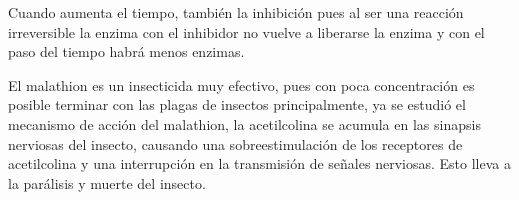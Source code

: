 Cuando aumenta el tiempo, también la inhibición pues al ser una reacción irreversible la enzima con el inhibidor no vuelve a liberarse la enzima y con el paso del tiempo habrá menos enzimas.


El malathion es un insecticida muy efectivo, pues con poca concentración es posible terminar con las plagas de insectos principalmente, ya se estudió el mecanismo de acción del malathion, la acetilcolina se acumula en las sinapsis nerviosas del insecto, causando una sobreestimulación de los receptores de acetilcolina y una interrupción en la transmisión de señales nerviosas. Esto lleva a la parálisis y muerte del insecto.


